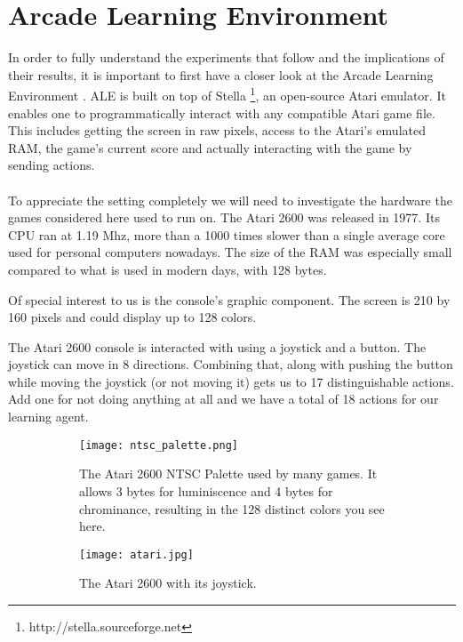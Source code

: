 \section{Arcade Learning Environment}
\label{sec:arcade_learning_environment}
In order to fully understand the experiments that follow
and the implications of their results,
it is important to first have a closer
look at the Arcade Learning Environment
\parencite{bellemare13arcade}.
ALE is built on top of Stella
\footnote{http://stella.sourceforge.net},
an open-source Atari emulator.
It enables one to programmatically interact
with any compatible Atari game file.
This includes getting the screen in raw pixels,
access to the Atari's emulated RAM,
the game's current score
and actually interacting with the game by sending actions.

\paragraph{}
To appreciate the setting completely we will need to
investigate the hardware the games considered here used to run on.
The Atari 2600 was released in 1977.
Its CPU ran at 1.19 Mhz,
more than a 1000 times slower
than a single average core used for personal computers nowadays.
The size of the RAM was especially small compared to
what is used in modern days, with 128 bytes.

Of special interest to us is the console's graphic component.
The screen is 210 by 160 pixels
and could display up to 128 colors.

The Atari 2600 console is interacted with using
a joystick and a button.
The joystick can move in 8 directions.
Combining that,
along with pushing the button
while moving the joystick
(or not moving it)
gets us to 17 distinguishable actions.
Add one for not doing anything at all
and we have a total of 18 actions for our learning agent.

\begin{figure}[h]
\center
\begin{subfigure}[t]{.5\textwidth}
  \centering
  \texttt{[image: ntsc\_palette.png]}
  \vspace{.1\baselineskip}
  \caption{
    The Atari 2600 NTSC Palette used by many games.
    It allows 3 bytes for luminiscence
    and 4 bytes for chrominance,
    resulting in the 128 distinct colors
    you see here.
  }
  \label{fig:nips_network}
\end{subfigure}
\hfill
\begin{subfigure}[t]{.4\textwidth}
  \centering
  \texttt{[image: atari.jpg]}
  \vspace{.1\baselineskip}
  \caption{
    The Atari 2600 with its joystick.
  }
  \label{fig:nature_network}
\end{subfigure}
\caption{}
\label{fig:dqn_networks}
\end{figure}

